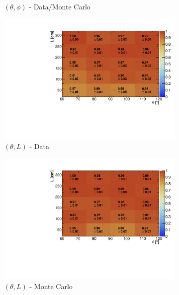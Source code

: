 \documentclass[a4paper,11pt]{article}
\begin{document}
\begin{figure}[htbp]
\begin{subfigure}{0.32\textwidth}
  \caption{$(\theta,\phi)$ - Data/Monte Carlo}
\end{subfigure}
\begin{subfigure}{0.32\textwidth}
  \includegraphics[width=\linewidth]{figures/e_theta_l.pdf}
  \caption{$(\theta,L)$ - Data}
\end{subfigure}\begin{subfigure}{0.32\textwidth}
\includegraphics[width=\linewidth]{figures/theta_l_mc.pdf}
\caption{$(\theta,L)$ - Monte Carlo}
\end{subfigure}\begin{subfigure}{0.32\textwidth}

\end{subfigure}
\end{figure}
\end{document}
